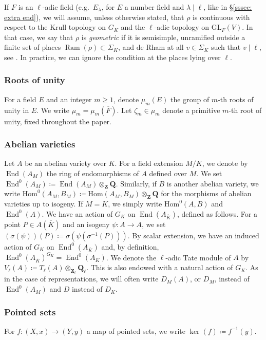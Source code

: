 \documentclass[a4paper,10pt]{amsart}
\theoremstyle{plain}
\theoremstyle{definition}
\theoremstyle{remark}
\def\Q{\mathbf Q}
\newcommand{\Ql}{\Q_{\ell}}
\def\Z{\mathbf Z}
\newcommand{\Zl}{\Z_{\ell}}
\def\GL{\mathrm{GL}}
\def\mr#1{\mathrm{#1}}
\renewcommand{\hom}{\mr{Hom}}
\DeclareMathOperator{\Ram}{Ram}
\DeclareMathOperator{\End}{End}
\begin{document}
If \(F\) is an \(\ell\)-adic field (e.g.\ \(E_\lambda\), for \(E\) a number field and \(\lambda \mid \ell\), like in \S\ref{sssec: extra end}), we will assume, unless otherwise stated, that \(\rho\) is continuous with respect to the Krull topology on \(G_K\) and the \(\ell\)-adic topology on \(\GL_F(V)\). In that case, we say that \(\rho\) is \emph{geometric} if it is semisimple, unramified outside a finite set of places \(\Ram(\rho) \subset \Sigma_K\), and de Rham at all \(v \in \Sigma_K\) such that \(v \mid \ell\), see \cite{fontainereppadic, fontainemazur}. In practice, we can ignore the condition at the places lying over \(\ell\).

\subsubsection*{Roots of unity} For a field \(E\) and an integer \(m \ge 1\), denote \(\mu_m(E)\) the group of \(m\)-th roots of unity in \(E\). We write \(\mu_m = \mu_m(\overline{F})\). Let \(\zeta_m \in \mu_m\) denote a primitive \(m\)-th root of unity, fixed throughout the paper.

\subsubsection*{Abelian varieties}
Let \(A\) be an abelian variety over \(K\). For a field extension \(M/K\), we denote by \(\End(A_M)\) the ring of endomorphisms of \(A\) defined over \(M\). We set \(\End^0(A_{M}) \coloneqq \End(A_{M}) \otimes_\Z \Q\). Similarly, if \(B\) is another abelian variety, we write \(\hom^0(A_M, B_M) \coloneqq \hom(A_M, B_M) \otimes_\Z \Q\) for the morphisms of abelian varieties up to isogeny. If \(M=K\), we simply write \(\hom^0(A, B)\) and \(\End^0(A)\).
We have an action of \(G_K\) on \(\End(A_{\overline{K}})\), defined as follows. 
For a point \(P\in A(\overline{K})\) and an isogeny \(\psi : A\rightarrow A\), 
we set \((\sigma(\psi))(P) \coloneqq \sigma(\psi(\sigma^{-1}(P)))\). By scalar extension, we have an induced action of \(G_K\) on \(\End^0(A_{\overline{K}})\) and, by definition, \(\End^0(A_{\overline{K}})^{G_K}=\End^0(A_{K})\). We denote the \(\ell\)-adic Tate module of \(A\) by \(V_\ell(A) \coloneqq T_\ell(A) \otimes_{\Zl} \Ql\). This is also endowed with a natural action of \(G_K\).
As in the case of representations, we will  often write \(D_M(A)\), or \(D_M\), instead of 
\(\End^0(A_M)\) and \(D\) instead of \(D_K\).

\subsubsection*{Pointed sets} For \(f \colon (X, x) \to (Y, y)\) a map of pointed sets, we write \(\ker(f) \coloneqq f^{-1}(y)\).
\end{document}
